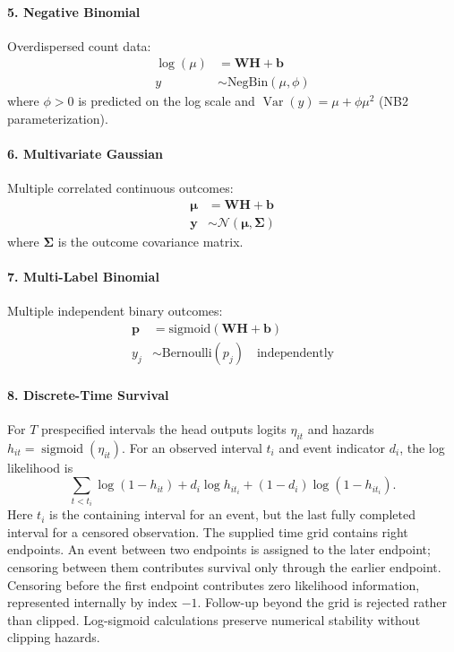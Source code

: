 \documentclass[12pt,a4paper]{article}
\newcommand{\N}{\mathcal{N}}
\newcommand{\by}{\mathbf{y}}
\newcommand{\bmu}{\boldsymbol{\mu}}
\newcommand{\bSigma}{\boldsymbol{\Sigma}}
\begin{document}
\paragraph{5. Negative Binomial}
Overdispersed count data:
\begin{align}
    \log(\mu) &= \mathbf{W}\mathbf{H} + \mathbf{b} \\
    y &\sim \text{NegBin}(\mu, \phi)
\end{align}
where $\phi>0$ is predicted on the log scale and $\operatorname{Var}(y)=\mu+\phi\mu^2$ (NB2 parameterization).

\paragraph{6. Multivariate Gaussian}
Multiple correlated continuous outcomes:
\begin{align}
    \bmu &= \mathbf{W}\mathbf{H} + \mathbf{b} \\
    \by &\sim \N(\bmu, \bSigma)
\end{align}
where $\bSigma$ is the outcome covariance matrix.

\paragraph{7. Multi-Label Binomial}
Multiple independent binary outcomes:
\begin{align}
    \mathbf{p} &= \text{sigmoid}(\mathbf{W}\mathbf{H} + \mathbf{b}) \\
    y_j &\sim \text{Bernoulli}(p_j) \quad \text{independently}
\end{align}

\paragraph{8. Discrete-Time Survival}
For $T$ prespecified intervals the head outputs logits $\eta_{it}$ and hazards
$h_{it}=\operatorname{sigmoid}(\eta_{it})$. For an observed interval $t_i$ and event indicator $d_i$, the log likelihood is
\begin{equation}
 \sum_{t<t_i}\log(1-h_{it})+d_i\log h_{it_i}+(1-d_i)\log(1-h_{it_i}).
\end{equation}
Here $t_i$ is the containing interval for an event, but the last fully completed interval for a censored observation. The supplied time grid contains right endpoints. An event between two endpoints is assigned to the later endpoint; censoring between them contributes survival only through the earlier endpoint. Censoring before the first endpoint contributes zero likelihood information, represented internally by index $-1$. Follow-up beyond the grid is rejected rather than clipped. Log-sigmoid calculations preserve numerical stability without clipping hazards.
\end{document}
